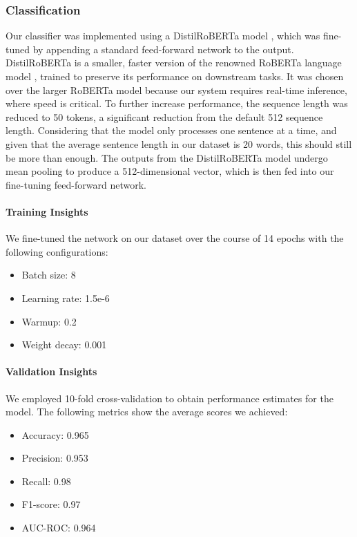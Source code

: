 \documentclass[sigconf]{acmart}
\begin{document}
\subsubsection{Classification}
Our classifier was implemented using a DistilRoBERTa model \cite{distilbert}, which was fine-tuned by appending a standard feed-forward network to the output. DistilRoBERTa is a smaller, faster version of the renowned RoBERTa language model \cite{roberta}, trained to preserve its performance on downstream tasks. It was chosen over the larger RoBERTa model because our system requires real-time inference, where speed is critical. To further increase performance, the sequence length was reduced to 50 tokens, a significant reduction from the default 512 sequence length. Considering that the model only processes one sentence at a time, and given that the average sentence length in our dataset is 20 words, this should still be more than enough.
The outputs from the DistilRoBERTa model undergo mean pooling to produce a 512-dimensional vector, which is then fed into our fine-tuning feed-forward network.

\paragraph{Training Insights}
We fine-tuned the network on our dataset over the course of 14 epochs with the following configurations:
\begin{itemize}
    \item Batch size: 8
    \item Learning rate: 1.5e-6
    \item Warmup: 0.2
    \item Weight decay: 0.001
\end{itemize}

\paragraph{Validation Insights}
We employed 10-fold cross-validation to obtain performance estimates for the model. The following metrics show the average scores we achieved:
\begin{itemize}
    \item Accuracy: 0.965
    \item Precision: 0.953
    \item Recall: 0.98
    \item F1-score: 0.97
    \item AUC-ROC: 0.964
\end{itemize}
\end{document}
